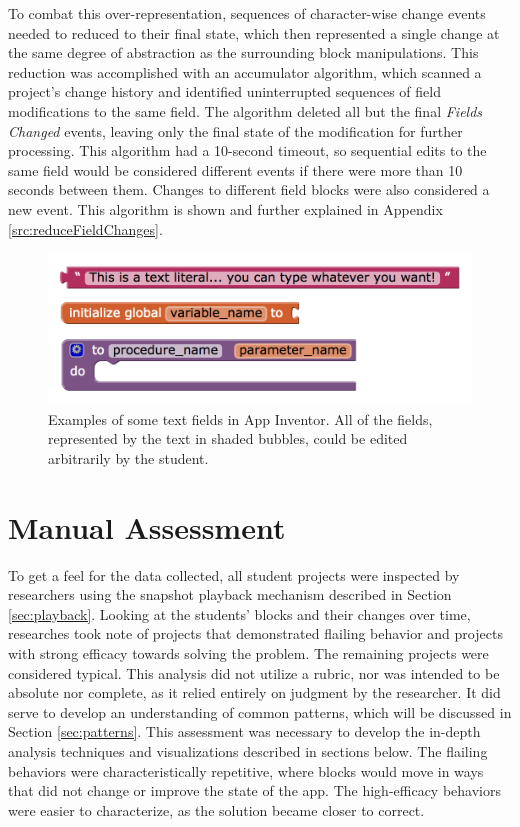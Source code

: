 To combat this over-representation, sequences of character-wise change events needed to reduced to their final state, which then represented a single change at the same degree of abstraction as the surrounding block manipulations. This reduction was accomplished with an accumulator algorithm, which scanned a project's change history and identified uninterrupted sequences of field modifications to the same field. The algorithm deleted all but the final \emph{Fields Changed} events, leaving only the final state of the modification for further processing. This algorithm had a 10-second timeout, so sequential edits to the same field would be considered different events if there were more than 10 seconds between them. Changes to different field blocks were also considered a new event. This algorithm is shown and further explained in Appendix \ref{src:reduceFieldChanges}.

\begin{figure}
  \centering
      \includegraphics[width=\textwidth]{images/ch4-text-fields}
  \caption[Examples of text fields in App Inventor]{Examples of some text fields in App Inventor. All of the fields, represented by the text in shaded bubbles, could be edited arbitrarily by the student.}
  \label{fig:text-fields}
\end{figure}


\section{Manual Assessment}
\label{sec:manual-assessment}
To get a feel for the data collected, all student projects were inspected by researchers using the snapshot playback mechanism described in Section \ref{sec:playback}. Looking at the students' blocks and their changes over time, researches took note of projects that demonstrated flailing behavior and projects with strong efficacy towards solving the problem. The remaining projects were considered typical. This analysis did not utilize a rubric, nor was intended to be absolute nor complete, as it relied entirely on judgment by the researcher. It did serve to develop an understanding of common patterns, which will be discussed in Section \ref{sec:patterns}. This assessment was necessary to develop the in-depth analysis techniques and visualizations described in sections below. The flailing behaviors were characteristically repetitive, where blocks would move in ways that did not change or improve the state of the app. The high-efficacy behaviors were easier to characterize, as the solution became closer to correct.


